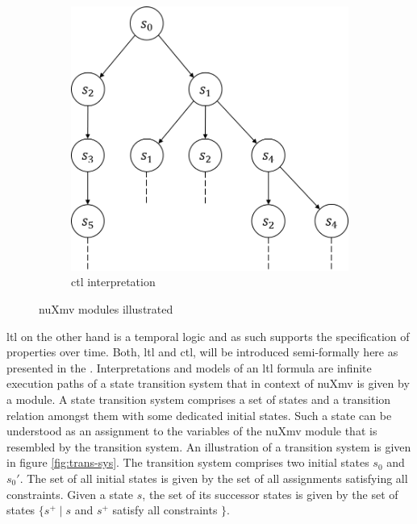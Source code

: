 \begin{figure}
    \begin{center}
        \begin{subfigure}[b]{\subfigw}
            \centering
            \includegraphics[scale=\figscale]{figures/ctl-interpretation.png}
            \caption{\gls{ctl} interpretation}
            \label{fig:ctl-int}
        \end{subfigure}
    \end{center}
    \caption{nuXmv modules illustrated}
\end{figure}

\gls{ltl} on the other hand is a temporal logic and as such supports the specification of properties over time.
Both, \gls{ltl} and \gls{ctl}, will be introduced semi-formally here as presented in the  \cite{nuXmv}.
Interpretations and models of an \gls{ltl} formula are infinite execution paths of a state transition system that in context of nuXmv is given by a module.
A state transition system comprises a set of states and a transition relation amongst them with some dedicated initial states.
Such a state can be understood as an assignment to the variables of the nuXmv module that is resembled by the transition system.
An illustration of a transition system is given in figure \ref{fig:trans-sys}.
The transition system comprises two initial states $ s_0 $ and $ s_0' $.
The set of all initial states is given by the set of all assignments satisfying all  constraints.
Given a state $ s $, the set of its successor states is given by the set of states $ \{ s^+ \mid s $ and $ s^+ $ satisfy all  constraints $ \} $.

